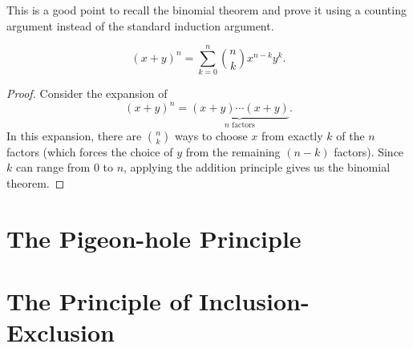 This is a good point to recall the binomial theorem and prove it using a counting argument instead of the standard induction argument.

\begin{theorem}
	\[
		\left( x+y \right)^n = \sum_{k=0}^{n}\binom{n}{k}x^{n-k}y^k
	.\] 
\end{theorem}
\begin{proof}
	Consider the expansion of
	\[
		\left( x+y \right)^n = \underbrace{\left( x+y \right) \cdots \left( x+y \right) }_{n \text{ factors}}.
	\]
	In this expansion, there are $\binom{n}{k}$ ways to choose $x$ from exactly $k$ of the $n$ factors (which forces the choice of $y$ from the remaining $(n-k)$ factors). Since $k$ can range from $0$ to $n$, applying the addition principle gives us the binomial theorem.
\end{proof}

\section{The Pigeon-hole Principle}
\section{The Principle of Inclusion-Exclusion}
